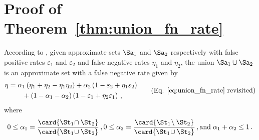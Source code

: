 \documentclass[ ../main.tex]{subfiles}
\begin{document}
\appendix
\appendices
\appendixpage
\addappheadtotoc
\section{Proof of Theorem~\ref{thm:union_fn_rate}}
\label{sec:proof_union_fn_rate}
According to , given approximate sets $\Sa_1$ and $\Sa_2$ respectively with false positive rates $\varepsilon_1$ and $\varepsilon_2$ and false negative rates $\eta_1$ and $\eta_2$, the union $\Sa_1 \cup \Sa_2$ is an approximate set with a false negative rate given by
\begin{equation*}
\begin{split}
    \eta &=
        \alpha_1 \left(\eta_1 + \eta_2 - \eta_1 \eta_2\right) + \alpha_2 \left(1 - \varepsilon_2 + \eta_1 \varepsilon_2\right)\\
        &\qquad+ (1 - \alpha_1 - \alpha_2) \left(1 - \varepsilon_1 + \eta_2 \varepsilon_1\right)\,,
\end{split}
\tag{Eq. \ref{eq:union_fn_rate} revisited}
\end{equation*}
where
\begin{equation*}
    0 \leq \alpha_1 = \frac{\card{\St_1 \! \cap \St_2}}{\card{\St_1 \! \cup \St_2}}\,,0 \leq \alpha_2 = \frac{\card{\St_1 \! \setminus \St_2}}{\card{\St_1 \! \cup \St_2}}\,, \text{and} \; \alpha_1 + \alpha_2 \leq 1\,.
\end{equation*}
\end{document}
